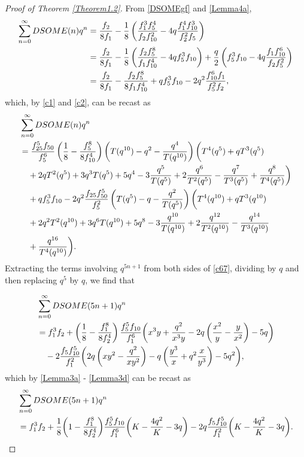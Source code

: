 \documentclass[12pt]{amsart}
\theoremstyle{definition}
\numberwithin{equation}{section}
\begin{document}
\begin{proof}[Proof of Theorem \ref{Theorem1.2}] From  \eqref{DSOMEgf} and \eqref{Lemma4a}, 
 \begin{align*}
\sum_{n=0}^{\infty}DSOME(n)q^n
&=\frac{f_2}{8f_1}-\frac{1}{8}\left(\frac{f_1^3f_5^4}{f_2f_{10}^2}-4q\frac{f_1^4f_{10}^3}{f_2^2f_5}\right)\notag\\
&=\frac{f_2}{8f_1}-\frac{1}{8}\left(\frac{f_{2}f_{5}^{8}}{f_{1}f_{10}^{4}}-4qf_{5}^{3}f_{10}\right)+\frac{q}{2}\left(f_{5}^{3}f_{10}-4q\frac{f_{1}f_{10}^{6}}{f_{2}f_{5}^{2}}\right)\notag\\
&=\frac{f_2}{8f_1}-\frac{f_{2}f_{5}^{8}}{8f_{1}f_{10}^{4}}+qf_{5}^{3}f_{10}-2q^2\frac{f_{10}^{6}f_{1}}{f_{5}^{2}f_{2}},\end{align*}
which, by \eqref{c1} and \eqref{c2}, can be recast as
\begin{align}
\label{c67}&\sum_{n=0}^{\infty}DSOME(n)q^n\\
&=\frac{f_{25}^{5}f_{50}}{f_{5}^{6}}\left(\frac{1}{8}-\frac{f_{5}^{8}}{8f_{10}^{4}}\right)\left(T(q^{10})-q^2-\frac{q^4}{T(q^{10})}\right)\bigg(T^4(q^5)+qT^3(q^5)
\notag\\
&\quad+2qT^2(q^5)+3q^3T(q^5)+5q^4-3\frac{q^5}{T(q^5)}+2\frac{q^6}{T^2(q^5)}
-\frac{q^7}{T^3(q^5)}
+\frac{q^8}{T^4(q^5)}\bigg)\notag\\
&\quad+qf_{5}^{3}f_{10}-2q^2\frac{f_{25}f_{50}^{5}}{f_{5}^{2}}\left(T(q^5)-q-\frac{q^2}{T(q^5)}\right)\bigg(T^4(q^{10})+qT^3(q^{10})\notag\\
&\quad+2q^{2}T^2(q^{10})+3q^{6}T(q^{10})+5q^8-3\frac{q^{10}}{T(q^{10})}+
2\frac{q^{12}}{T^2(q^{10})}-\frac{q^{14}}{T^3(q^{10})}\notag\\
&\quad+\frac{q^{16}}{T^4(q^{10})}\bigg).\notag
\end{align}
Extracting the terms involving $q^{5n+1}$ from both sides of \eqref{c67}, dividing by $q$ and then replacing $q^5$ by $q$, we find that

\begin{align*}
&\sum_{n=0}^{\infty}DSOME(5n+1)q^n\notag\\
&=f_{1}^{3}f_{2}+\left(\frac{1}{8}-\frac{f_{1}^{8}}{8f_{2}^{4}}\right)\frac{f_{5}^{5}f_{10}}{f_{1}^{6}}\bigg(x^{3}y+\frac{q^2}{x^{3}y}-2q\left(\frac{x^2}{y}-\frac{y}{x^2}\right)
-5q\bigg)\\
&\quad-2\frac{f_{5}f_{10}^{5}}{f_{1}^{2}}\bigg(2q\left(xy^2-\frac{q^2}{xy^2}\right)-q\left(\frac{y^3}{x}+q^2\frac{x}{y^3}\right)
-5q^2\bigg),\end{align*}
which by \eqref{Lemma3a} - \eqref{Lemma3d} can be recast as
\begin{align}
\label{e1}&\sum_{n=0}^{\infty}DSOME(5n+1)q^n\\
&=f_1^3f_2+\frac{1}{8}\bigg(1-\frac{f_{1}^{8}}{8f_{2}^{4}}\bigg)\frac{f_{5}^{5}f_{10}}{f_{1}^{6}}\bigg(K-\frac{4q^2}{K}-3q\bigg)-2q\frac{f_{5}f_{10}^{5}}{f_{1}^{2}}
\bigg(K-\frac{4q^2}{K}-3q\bigg)\notag.
    \end{align}


\end{proof}
\end{document}
